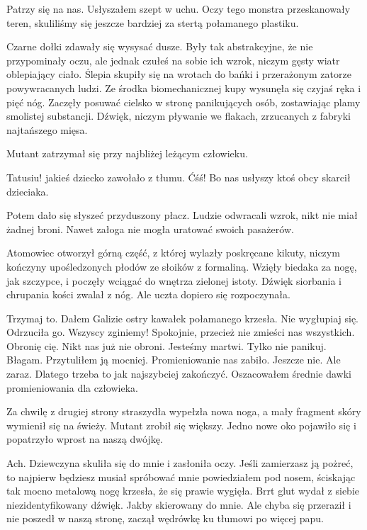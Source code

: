 \begin{dialogue}
	\ds{} Patrzy się na nas. \dm{} Usłyszałem szept w uchu. Oczy tego monstra przeskanowały teren, skuliliśmy się jeszcze bardziej za stertą połamanego plastiku.
\end{dialogue}

Czarne dołki zdawały się wysysać dusze.
Były tak abstrakcyjne, że nie przypominały oczu, ale jednak czułeś na sobie ich wzrok, niczym gęsty wiatr oblepiający ciało.
Ślepia skupiły się na wrotach do bańki i przerażonym zatorze powywracanych ludzi.
Ze środka biomechanicznej kupy wysunęła się czyjaś ręka i pięć nóg.
Zaczęły posuwać cielsko w stronę panikujących osób, zostawiając plamy smolistej substancji.
Dźwięk, niczym pływanie we flakach, zrzucanych z fabryki najtańszego mięsa.

Mutant zatrzymał się przy najbliżej leżącym człowieku.
\begin{dialogue}
	\ds{} Tatusiu! \dm{} jakieś dziecko zawołało z tłumu.
	\ds{} Ćśś! Bo nas usłyszy \dm{} ktoś obcy skarcił dzieciaka.
\end{dialogue}

Potem dało się słyszeć przyduszony płacz.
Ludzie odwracali wzrok, nikt nie miał żadnej broni.
Nawet załoga nie mogła uratować swoich pasażerów.

Atomowiec otworzył górną część, z której wylazły poskręcane kikuty, niczym kończyny upośledzonych płodów ze słoików z formaliną.
Wzięły biedaka za nogę, jak szczypce, i poczęły wciągać do wnętrza zielonej istoty.
Dźwięk siorbania i chrupania kości zwalał z nóg.
Ale uczta dopiero się rozpoczynała.

\begin{dialogue}
	\ds{} Trzymaj to. \dm{} Dałem Galizie ostry kawałek połamanego krzesła.
	\ds{} Nie wygłupiaj się. \dm{} Odrzuciła go. \dm{} Wszyscy zginiemy!
	\ds{} Spokojnie, przecież nie zmieści nas wszystkich. Obronię cię.
	\ds{} Nikt nas już nie obroni. Jesteśmy martwi.
	\ds{} Tylko nie panikuj. Błagam. \dm{} Przytuliłem ją mocniej.
	\ds{} Promieniowanie nas zabiło.
	\ds{} Jeszcze nie. Ale zaraz. Dlatego trzeba to jak najszybciej zakończyć. \dm{} Oszacowałem średnie dawki promieniowania dla człowieka.
\end{dialogue}

Za chwilę z drugiej strony straszydła wypełzła nowa noga, a mały fragment skóry wymienił się na świeży.
Mutant zrobił się większy.
Jedno nowe oko pojawiło się i popatrzyło wprost na naszą dwójkę.
\begin{dialogue}
	\ds{} Ach. \dm{} Dziewczyna skuliła się do mnie i zasłoniła oczy.
	\ds{} Jeśli zamierzasz ją pożreć, to najpierw będziesz musiał spróbować mnie \dm{} powiedziałem pod nosem, ściskając tak mocno metalową nogę krzesła, że się prawie wygięła.
	\ds{} Brrt \dm{} glut wydał z siebie niezidentyfikowany dźwięk. Jakby skierowany do mnie. Ale chyba się przeraził i nie poszedł w naszą stronę, zaczął wędrówkę ku tłumowi po więcej papu.
\end{dialogue}

